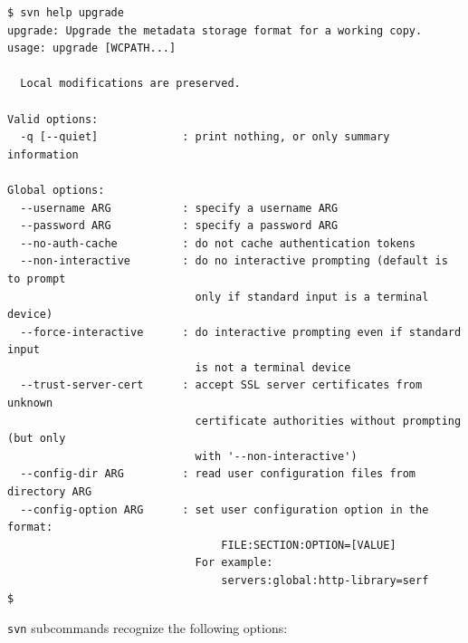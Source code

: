 \begin{verbatim}
$ svn help upgrade
upgrade: Upgrade the metadata storage format for a working copy.
usage: upgrade [WCPATH...]

  Local modifications are preserved.

Valid options:
  -q [--quiet]             : print nothing, or only summary information

Global options:
  --username ARG           : specify a username ARG
  --password ARG           : specify a password ARG
  --no-auth-cache          : do not cache authentication tokens
  --non-interactive        : do no interactive prompting (default is to prompt
                             only if standard input is a terminal device)
  --force-interactive      : do interactive prompting even if standard input
                             is not a terminal device
  --trust-server-cert      : accept SSL server certificates from unknown
                             certificate authorities without prompting (but only
                             with '--non-interactive')
  --config-dir ARG         : read user configuration files from directory ARG
  --config-option ARG      : set user configuration option in the format:
                                 FILE:SECTION:OPTION=[VALUE]
                             For example:
                                 servers:global:http-library=serf
$
\end{verbatim}

\texttt{svn} subcommands recognize the following options:

\protect{}\label{svn.ref.svn.sw}{}

